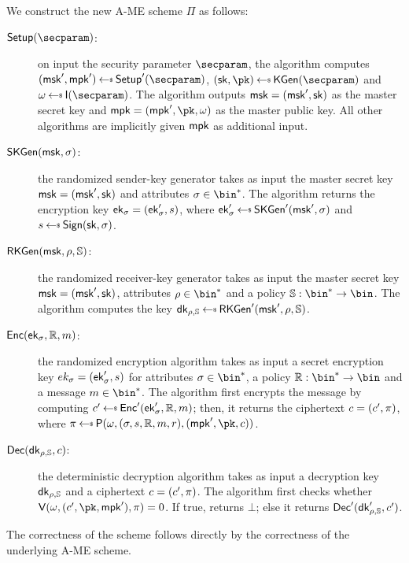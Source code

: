 \begin{construction}
    We construct the new A-ME scheme $\Pi$ as follows:
    \begin{description}
        \item[$\setup(\secparam)$:] on input the security parameter $\secparam$, the algorithm computes $(\msk', \mpk') \getsr \setup'(\secparam)$, $(\sk, \pk) \getsr \kgen(\secparam)$ and $\crs \getsr \init(\secparam)$. The algorithm outputs $\mathsf{msk} = (\mathsf{msk}', \mathsf{sk})$ as the master secret key and $\mpk = (\mpk', \pk, \crs)$ as the master public key. All other algorithms are implicitly given $\mathsf{mpk}$ as additional input.
        \item[$\mathsf{SKGen}(\mathsf{msk}, \sigma)$:] the randomized sender-key generator takes as input the master secret key $\mathsf{msk} = (\mathsf{msk}', \mathsf{sk})$ and attributes $\sattr \in \bin^*$. The algorithm returns the encryption key $\mathsf{ek}_\sigma = (\mathsf{ek}'_\sigma, s)$, where $\ek'_\sattr \getsr \skgen'(\msk', \sattr)$ and $\signature \getsr \sign(\sk, \sattr)$.
        \item[$\mathsf{RKGen}(\mathsf{msk}, \rho, \mathbb{S})$:] the randomized receiver-key generator takes as input the master secret key $\mathsf{msk} = (\mathsf{msk}', \mathsf{sk})$, attributes $\rattr \in \bin^*$ and a policy $\saccess:\bin^* \to \bin$. The algorithm computes the key $\dk_{\rattr, \saccess} \getsr \rkgen'(\msk', \rattr, \saccess)$.
        \item[$\mathsf{Enc}(\mathsf{ek}_\sigma, \mathbb{R}, m)$:] the randomized encryption algorithm takes as input a secret encryption key $ek_\sigma = (\mathsf{ek}'_\sigma, s)$ for attributes $\sattr \in \bin^*$, a policy $\raccess: \bin^* \to \bin$ and a message $\msg \in \bin^*$. The algorithm first encrypts the message by computing $\cipher' \getsr \enc'(\ek'_\sattr, \raccess, \msg)$; then, it returns the ciphertext $c = (c', \pi)$, where $\pi \getsr \prover(\crs, (\sattr, \signature, \raccess, \msg, r),(\mpk', \pk, \cipher))$.
        \item[$\mathsf{Dec}(\mathsf{dk}_{\rho, \mathbb{S}}, c)$:] the deterministic decryption algorithm takes as input a decryption key $\mathsf{dk}_{\rho, \mathbb{S}}$ and a ciphertext $c = (c', \pi)$. The algorithm first checks whether $\verifier(\crs, (\cipher', \pk, \mpk'), \pi) = 0$. If true, returns $\bot$; else it returns $\mathsf{Dec}'(\mathsf{dk}'_{\rho, \mathbb{S}}, c')$.
    \end{description}
\end{construction}

The correctness of the scheme follows directly by the correctness of the underlying A-ME scheme.


